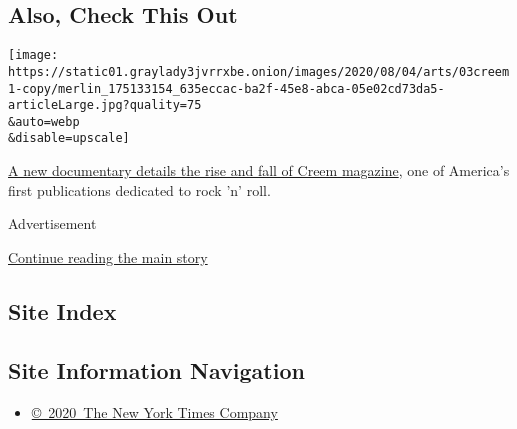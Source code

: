 \hypertarget{also-check-this-out}{%
\subsection{Also, Check This Out}\label{also-check-this-out}}

\texttt{[image: https://static01.graylady3jvrrxbe.onion/images/2020/08/04/arts/03creem1-copy/merlin\_175133154\_635eccac-ba2f-45e8-abca-05e02cd73da5-articleLarge.jpg?quality=75\\\&auto=webp\\\&disable=upscale]}

\href{https://www.nytimes3xbfgragh.onion/2020/08/03/arts/music/creem-magazine-documentary.html}{A
new documentary details the rise and fall of Creem magazine}, one of
America's first publications dedicated to rock 'n' roll.

Advertisement

\protect\hyperlink{after-bottom}{Continue reading the main story}

\hypertarget{site-index}{%
\subsection{Site Index}\label{site-index}}

\hypertarget{site-information-navigation}{%
\subsection{Site Information
Navigation}\label{site-information-navigation}}

\begin{itemize}
\tightlist
\item
  \href{https://help.nytimes3xbfgragh.onion/hc/en-us/articles/115014792127-Copyright-notice}{©~2020~The
  New York Times Company}
\end{itemize}

